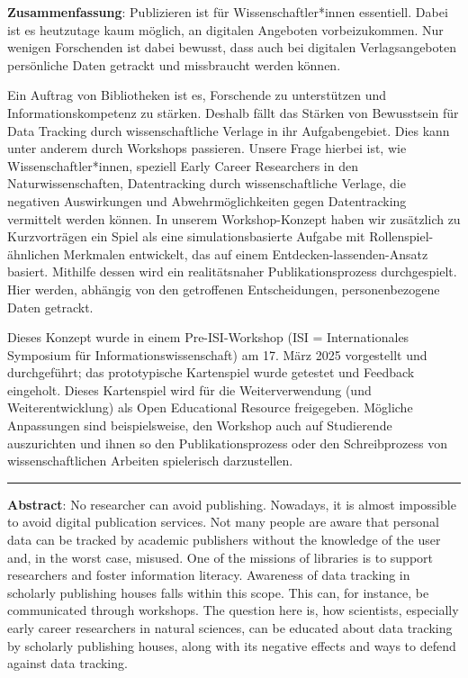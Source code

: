 \textbf{Zusammenfassung}: Publizieren ist für Wissenschaftler*innen
essentiell. Dabei ist es heutzutage kaum möglich, an digitalen Angeboten
vorbeizukommen. Nur wenigen Forschenden ist dabei bewusst, dass auch bei
digitalen Verlagsangeboten persönliche Daten getrackt und missbraucht
werden können.

Ein Auftrag von Bibliotheken ist es, Forschende zu unterstützen und
Informationskompetenz zu stärken. Deshalb fällt das Stärken von
Bewusstsein für Data Tracking durch wissenschaftliche Verlage in ihr
Aufgabengebiet. Dies kann unter anderem durch Workshops passieren.
Unsere Frage hierbei ist, wie Wissenschaftler*innen, speziell Early
Career Researchers in den Naturwissenschaften, Datentracking durch
wissenschaftliche Verlage, die negativen Auswirkungen und
Abwehrmöglichkeiten gegen Datentracking vermittelt werden können. In
unserem Workshop-Konzept haben wir zusätzlich zu Kurzvorträgen ein Spiel
als eine simulationsbasierte Aufgabe mit Rollenspiel-ähnlichen Merkmalen
entwickelt, das auf einem Entdecken-lassenden-Ansatz basiert. Mithilfe
dessen wird ein realitätsnaher Publikationsprozess durchgespielt. Hier
werden, abhängig von den getroffenen Entscheidungen, personenbezogene
Daten getrackt.

Dieses Konzept wurde in einem Pre-ISI-Workshop (ISI = Internationales
Symposium für Informationswissenschaft) am 17. März 2025 vorgestellt und
durchgeführt; das prototypische Kartenspiel wurde getestet und Feedback
eingeholt. Dieses Kartenspiel wird für die Weiterverwendung (und
Weiterentwicklung) als Open Educational Resource freigegeben. Mögliche
Anpassungen sind beispielsweise, den Workshop auch auf Studierende
auszurichten und ihnen so den Publikationsprozess oder den
Schreibprozess von wissenschaftlichen Arbeiten spielerisch darzustellen.

\begin{center}\rule{0.5\linewidth}{0.5pt}\end{center}

\textbf{Abstract}: No researcher can avoid publishing. Nowadays, it is
almost impossible to avoid digital publication services. Not many people
are aware that personal data can be tracked by academic publishers
without the knowledge of the user and, in the worst case, misused. One
of the missions of libraries is to support researchers and foster
information literacy. Awareness of data tracking in scholarly publishing
houses falls within this scope. This can, for instance, be communicated
through workshops. The question here is, how scientists, especially
early career researchers in natural sciences, can be educated about data
tracking by scholarly publishing houses, along with its negative effects
and ways to defend against data tracking.

